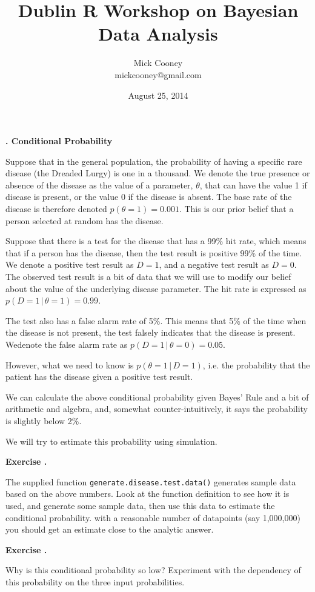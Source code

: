 \documentclass[10pt, a4paper]{article}
\title{Dublin R Workshop on Bayesian Data Analysis}
\author{Mick Cooney\\mickcooney@gmail.com}
\date{August 25, 2014}
\newcounter{wssection}
\newcounter{wsexercise}[wssection]
\newcommand{\worksheetsection}[1]{
\vspace{10mm}
\stepcounter{wssection}
\noindent \Large \textbf{\thewssection. #1} \normalsize
\vspace{3mm}
}
\newcommand{\worksheetexercise}{
\stepcounter{wsexercise}
\vspace{5mm} \noindent \textbf{Exercise \thewssection.\thewsexercise \;}
}
\begin{document}
\maketitle


\worksheetsection{Conditional Probability}

\noindent
Suppose that in the general population, the probability of having a
specific rare disease (the Dreaded Lurgy) is one in a thousand. We
denote the true presence or absence of the disease as the value of a
parameter, $\theta$, that can have the value 1 if disease is present,
or the value 0 if the disease is absent. The base rate of the disease
is therefore denoted $p(\theta = 1) = 0.001$. This is our prior belief
that a person selected at random has the disease.

Suppose that there is a test for the disease that has a 99\% hit rate,
which means that if a person has the disease, then the test result is
positive 99\% of the time. We denote a positive test result as $D = 1$,
and a negative test result as $D = 0$. The observed test result is
a bit of data that we will use to modify our belief about the value of
the underlying disease parameter. The hit rate is expressed as
$p(D = 1 \, | \, \theta = 1) = 0.99$.

The test also has a false alarm rate of 5\%. This means that 5\% of
the time when the disease is not present, the test falsely indicates
that the disease is present. Wedenote the false alarm rate as
$p(D = 1 \, | \, \theta = 0) = 0.05$.

However, what we need to know is $p(\theta = 1 \, | \, D = 1)$, i.e. the
probability that the patient has the disease given a positive test
result.

We can calculate the above conditional probability given Bayes' Rule
and a bit of arithmetic and algebra, and, somewhat
counter-intuitively, it says the probability is slightly below 2\%.

We will try to estimate this probability using simulation.

\worksheetexercise
The supplied function \texttt{generate.disease.test.data()} generates
sample data based on the above numbers. Look at the function
definition to see how it is used, and generate some sample data, then
use this data to estimate the conditional probability. with a
reasonable number of datapoints (say 1,000,000) you should get an
estimate close to the analytic answer.


\worksheetexercise
Why is this conditional probability so low? Experiment with the
dependency of this probability on the three input probabilities.
\end{document}

